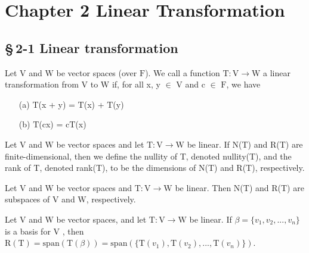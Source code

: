 

	\section*{Chapter 2 Linear Transformation}	
	\subsection*{\S\,2-1 Linear transformation}
\begin{defn}
$ $\\	Let $\mathrm{V}$ and $\mathrm{W}$ be vector spaces (over $\mathrm{F}$). We call a function $\mathrm{T}: \mathrm{V}  \rightarrow  \mathrm{W}$    a linear transformation from $\mathrm{V}$ to $\mathrm{W}$ if, for all x, y $\in$ $\mathrm{V}$ and c $\in$ $\mathrm{F}$, we have

\begin{enumerate}
	\item [(a)]   $\mathrm{T}$(x + y) = $\mathrm{T}$(x) + $\mathrm{T}$(y) 
	\item [(b)]    $\mathrm{T}$($\mathrm{c}$x) = $\mathrm{c}\mathrm{T}$(x)
\end{enumerate} 
\end{defn}

\begin{defn}
$ $\\	Let $\mathrm{V}$ and $\mathrm{W}$ be vector spaces and let $\mathrm{T}: \mathrm{V}  \rightarrow  \mathrm{W}$ be linear. If N(T) and R(T) are finite-dimensional, then we define the nullity of T, denoted nullity(T), and the rank of T, denoted rank(T), to be the dimensions of N(T) and R(T), respectively.
\end{defn}

\begin{thm*}
$ $ \\ 	Let V and W be vector spaces and $\mathrm{T}: \mathrm{V}  \rightarrow  \mathrm{W}$ be linear. Then N(T) and R(T) are subspaces of $\mathrm{V}$ and $\mathrm{W}$, respectively.
\end{thm*}

\begin{thm*}
$ $\\
 Let V and W be vector spaces, and let $\mathrm{T} : \mathrm{V}  \rightarrow \mathrm{W}$ be linear. If $\beta = \{ v_1,v_2,...,v_n \}$ is a basis for $\mathrm{V}$ , then $ \mathrm{R}(\mathrm{T}) = \mathrm{span}(\mathrm{T}(\beta)) = \mathrm{span}(\{\mathrm{T}(v_1), \mathrm{T}(v_2), . . . , \mathrm{T}(v_n)\})$.

\end{thm*}

